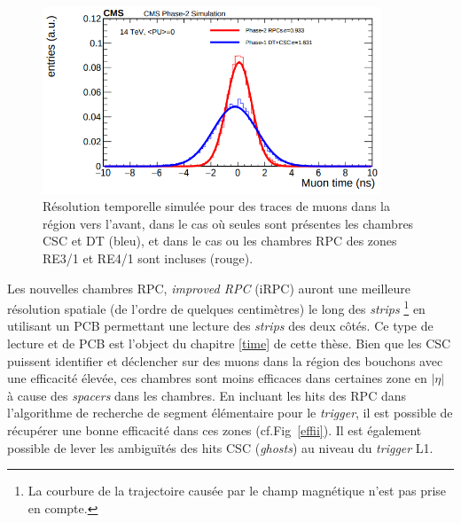 \begin{itemize}[label=$\bullet$]
	\begin{figure}[ht!]
		\centering
		\includegraphics[width=0.90\textwidth]{RPC/intrasec.png}
		\captionsetup{type=subfigure}\caption{Résolution temporelle simulée pour des traces de muons dans la région vers l'avant, dans le cas où seules sont présentes les chambres CSC et DT (bleu), et dans le cas ou les chambres RPC des zones RE3/1 et RE4/1 sont incluses (rouge).}
		\label{intrasec}
	\end{figure}
	Les nouvelles chambres RPC, \textit{improved RPC} (iRPC) auront une meilleure résolution spatiale (de l'ordre de quelques centimètres) le long des \textit{strips} \footnote{La courbure de la trajectoire causée par le champ magnétique n'est pas prise en compte.} en utilisant un PCB permettant une lecture des \textit{strips} des deux côtés. Ce type de lecture et de PCB est l'object du chapitre \ref{time} de cette thèse.
	\newpage
	Bien que les CSC puissent identifier et déclencher sur des muons dans la région des bouchons avec une efficacité élevée, ces chambres sont moins efficaces dans certaines zone en $|\eta|$ à cause des \textit{spacers} dans les chambres. En incluant les hits des RPC dans l'algorithme de recherche de segment élémentaire pour le \textit{trigger}, il est possible de récupérer une bonne efficacité dans ces zones (cf.Fig~\ref{effii}). Il est également possible de lever les ambiguïtés des hits CSC (\textit{ghosts})  au niveau du \textit{trigger} L1.
	

\end{itemize}

